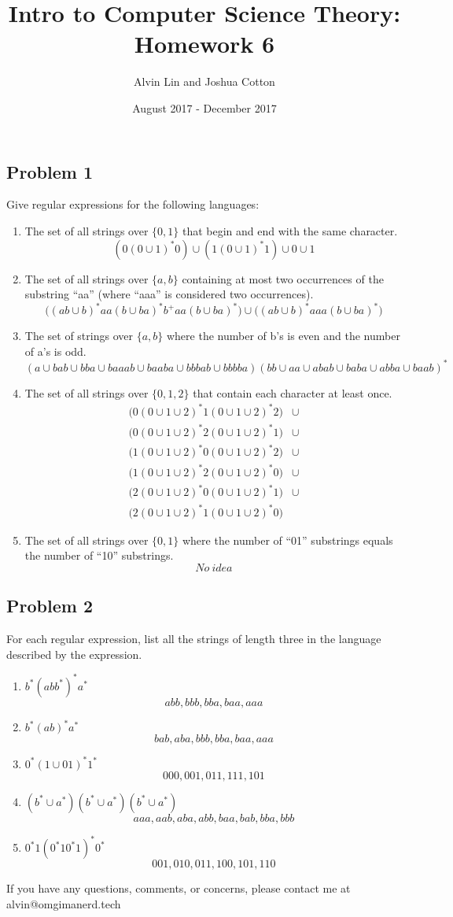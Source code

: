 \documentclass{math}
\title{Intro to Computer Science Theory: Homework 6}
\author{Alvin Lin and Joshua Cotton}
\date{August 2017 - December 2017}
\begin{document}
\maketitle

\subsection*{Problem 1}
Give regular expressions for the following languages:
\begin{enumerate}
  \item The set of all strings over \( \{0,1\} \) that begin and end with the
  same character.
  \[ (0(0\cup1)^*0)\cup(1(0\cup1)^*1)\cup0\cup1 \]
  \item The set of all strings over \( \{a,b\} \) containing at most two
  occurrences of the substring ``aa'' (where ``aaa'' is considered two
  occurrences).
  \[ \bigg((ab\cup b)^*aa(b\cup ba)^*b^+aa(b\cup ba)^*\bigg)\cup
    \bigg((ab\cup b)^*aaa(b\cup ba)^*\bigg) \]
  \item The set of strings over \( \{a,b\} \) where the number of b's is even
  and the number of a's is odd.
  \[ (a\cup bab\cup bba\cup baaab\cup baaba\cup bbbab\cup bbbba)
    (bb\cup aa\cup abab\cup baba\cup abba\cup baab)^* \]
  \item The set of all strings over \( \{0,1,2\} \) that contain each character
  at least once.
  \begin{align*}
    \bigg(0(0\cup1\cup2)^*1(0\cup1\cup2)^*2\bigg) &\cup \\
    \bigg(0(0\cup1\cup2)^*2(0\cup1\cup2)^*1\bigg) &\cup \\
    \bigg(1(0\cup1\cup2)^*0(0\cup1\cup2)^*2\bigg) &\cup \\
    \bigg(1(0\cup1\cup2)^*2(0\cup1\cup2)^*0\bigg) &\cup \\
    \bigg(2(0\cup1\cup2)^*0(0\cup1\cup2)^*1\bigg) &\cup \\
    \bigg(2(0\cup1\cup2)^*1(0\cup1\cup2)^*0\bigg)
  \end{align*}
  \item The set of all strings over \( \{0,1\} \) where the number of ``01''
  substrings equals the number of ``10'' substrings.
  \[ No~idea \]
\end{enumerate}

\subsection*{Problem 2}
For each regular expression, list all the strings of length three in the
language described by the expression.
\begin{enumerate}
  \item \( b^*(abb^*)^*a^* \)
  \[ abb, bbb, bba, baa, aaa \]
  \item \( b^*(ab)^*a^* \)
  \[ bab, aba, bbb, bba, baa, aaa \]
  \item \( 0^*(1\cup01)^*1^* \)
  \[ 000, 001, 011, 111, 101 \]
  \item \( (b^*\cup a^*)(b^*\cup a^*)(b^*\cup a^*) \)
  \[ aaa, aab, aba, abb, baa, bab, bba, bbb \]
  \item \( 0^*1(0^*10^*1)^*0^* \)
  \[ 001, 010, 011, 100, 101, 110 \]
\end{enumerate}

\begin{center}
  If you have any questions, comments, or concerns, please contact me at
  alvin@omgimanerd.tech
\end{center}
\end{document}
